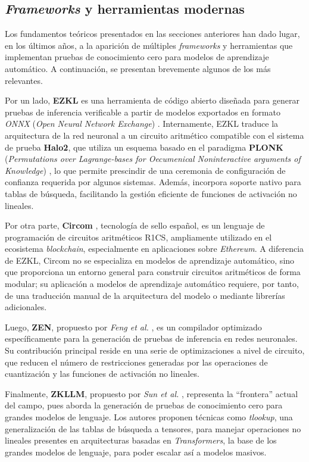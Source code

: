 \documentclass[a4paper, 11pt]{article}
\begin{document}
\subsection{\textit{Frameworks} y herramientas modernas} \label{zkml_frameworks}

Los fundamentos teóricos presentados en las secciones anteriores han dado lugar, en los últimos años,
a la aparición de múltiples \textit{frameworks} y herramientas que implementan pruebas de conocimiento
cero para modelos de aprendizaje automático. A continuación, se presentan brevemente algunos de los
más relevantes.

Por un lado, \textbf{EZKL} es una herramienta de código abierto diseñada para generar pruebas de
inferencia verificable a partir de modelos exportados en formato \textit{ONNX} (\textit{Open Neural
  Network Exchange}) \cite{ezkl2024docs}. Internamente, EZKL traduce la arquitectura de la red neuronal
a un circuito aritmético compatible con el sistema de prueba \textbf{Halo2}, que utiliza un esquema
basado en el paradigma \textbf{PLONK} (\textit{Permutations over Lagrange-bases for Oecumenical
  Noninteractive arguments of Knowledge}) \cite{plonk2019}, lo que permite prescindir de una ceremonia
de configuración de confianza requerida por algunos sistemas. Además, incorpora soporte nativo
para tablas de búsqueda, facilitando la gestión eficiente de funciones de activación no lineales.

Por otra parte, \textbf{Circom} \cite{belles2023circom}, tecnología de sello español, es un lenguaje
de programación de circuitos aritméticos R1CS, ampliamente utilizado en el ecosistema \textit{blockchain},
especialmente en aplicaciones sobre \textit{Ethereum}. A diferencia de EZKL, Circom no se especializa
en modelos de aprendizaje automático, sino que proporciona un entorno general para construir circuitos
aritméticos de forma modular; su aplicación a modelos de aprendizaje automático requiere, por tanto,
de una traducción manual de la arquitectura del modelo o mediante librerías adicionales.

Luego, \textbf{ZEN}, propuesto por \textit{Feng et al.} \cite{feng2021zen}, es un compilador optimizado
específicamente para la generación de pruebas de inferencia en redes neuronales. Su contribución
principal reside en una serie de optimizaciones a nivel de circuito, que reducen el número de
restricciones generadas por las operaciones de cuantización y las funciones de activación no lineales.

Finalmente, \textbf{ZKLLM}, propuesto por \textit{Sun et al.} \cite{sun2024zkllm}, representa la
``frontera'' actual del campo, pues aborda la generación de pruebas de conocimiento cero para grandes
modelos de lenguaje. Los autores proponen técnicas como \textit{tlookup}, una generalización de las
tablas de búsqueda a tensores, para manejar operaciones no lineales presentes en arquitecturas
basadas en \textit{Transformers}, la base de los grandes modelos de lenguaje, para poder escalar así
a modelos masivos.
\end{document}
